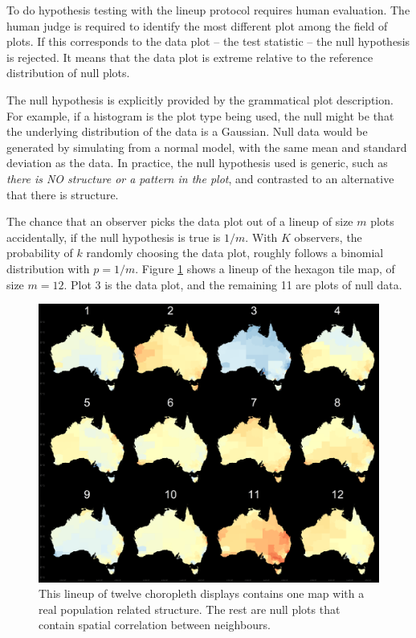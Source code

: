 \documentclass{monashthesis}
\begin{document}
To do hypothesis testing with the lineup protocol requires human evaluation. The human judge is required to identify the most different plot among the field of plots. If this corresponds to the data plot -- the test statistic -- the null hypothesis is rejected. It means that the data plot is extreme relative to the reference distribution of null plots.

The null hypothesis is explicitly provided by the grammatical plot description. For example, if a histogram is the plot type being used, the null might be that the underlying distribution of the data is a Gaussian. Null data would be generated by simulating from a normal model, with the same mean and standard deviation as the data. In practice, the null hypothesis used is generic, such as \emph{there is NO structure or a pattern in the plot}, and contrasted to an alternative that there is structure.

The chance that an observer picks the data plot out of a lineup of size \(m\) plots accidentally, if the null hypothesis is true is \(1/m\). With \(K\) observers, the probability of \(k\) randomly choosing the data plot, roughly follows a binomial distribution with \(p=1/m\). Figure \ref{fig:lineup} shows a lineup of the hexagon tile map, of size \(m=12\). Plot 3 is the data plot, and the remaining 11 are plots of null data.

\begin{figure}[H]
\centering
\includegraphics[width=16cm]{figures/04-experiment/aus_cities_3_geo.png}
\caption{\label{fig:lineup}This lineup of twelve choropleth displays contains one map with a real population related structure. The rest are null plots that contain spatial correlation between neighbours.}
\end{figure}
\end{document}
